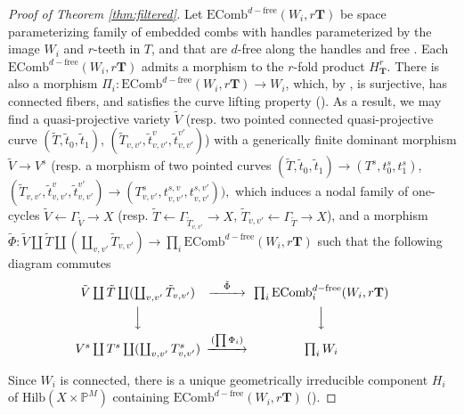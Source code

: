 \documentclass{amsart}
\theoremstyle{definition}
\theoremstyle{remark}
\newcommand{\mbb}{\mathbb}
\newcommand{\PP}{\mbb{P}}
\newcommand{\ecomb}{\text{EComb}}
\newcommand{\free}{\text{free}}
\begin{document}
\begin{proof}[Proof of Theorem \ref{thm:filtered}]
     Let $\ecomb^{d-\free}(W_i, r \mathbf{T})$ be space parameterizing family of embedded combs with handles parameterized by the image $W_i$ and $r$-teeth in $T$, and that are $d$-free along the handles and free \cite[Definition 45, (41.2)]{Kollar_Tian}. 
    Each $\ecomb^{d-\free}(W_i, r \mathbf{T})$ admits a morphism to the $r$-fold product $H_\mathbf{T}^r$.
     There is also a morphism $\Pi_i: \ecomb^{d-\free}(W_i, r \mathbf{T}) \to W_i$, which, by \cite[Theorem 48]{Kollar_Tian}, is surjective, has connected fibers, and satisfies the curve lifting property (\cite[Definition 47]{Kollar_Tian}).
     As a result, we may find a quasi-projective variety $\tilde{V}$ (resp. two pointed connected quasi-projective curve $(\tilde{T}, \tilde{t}_0, \tilde{t}_1)$, $(\tilde{T}_{v, v'}, \tilde{t}_{v, v'}^v, \tilde{t}_{v, v'}^{v'})$)  with a generically finite dominant morphism $\tilde{V} \to V^s$ (resp. a morphism of two pointed curves $(\tilde{T}, \tilde{t}_0, \tilde{t}_1) \to ({T}^s, {t}^s_0, {t}^s_1)$, $(\tilde{T}_{v, v'}, \tilde{t}_{v, v'}^v, \tilde{t}_{v, v'}^{v'})\to ({T}^s_{v, v'}, {t}_{v, v'}^{s, v}, {t}_{v, v'}^{s, v'}) ),$ which induces a nodal family of one-cycles $\tilde{
V} \leftarrow \Gamma_{\tilde{V}} \to X$ (resp. $\tilde{T} \leftarrow \Gamma_{\tilde{T}_{v, v'}} \to X$, $\tilde{T}_{v, v'}\leftarrow \Gamma_{\tilde{T}}\to X$), and a morphism 
     $\tilde{\Phi}: \tilde{V} \coprod \tilde{T} \coprod (\coprod_{v, v'} \tilde{T}_{v,v'}) \to \prod_i \ecomb^{d-\free}(W_i, r \mathbf{T})$
     such that the following diagram commutes
     \[
     \begin{CD}
         \tilde{V} \coprod \tilde{T} \coprod (\coprod_{v, v'} \tilde{T}_{v,v'}) @>\tilde{\Phi}>> \prod_i \ecomb^{d-\free}_i(W_i, r \mathbf{T})\\
         @VVV @VVV\\
         V^s \coprod T^s \coprod (\coprod_{v, v'} T^s_{v,v'}) @>(\prod \Phi_i) >> \prod_i W_i 
     \end{CD}
     \]
     
    Since $W_i$ is connected, there is a unique geometrically irreducible component $H_i$ of $\text{Hilb}(X \times \PP^M)$ containing $\ecomb^{d-\free}(W_i, r \mathbf{T})$ (\cite[Corollary 49]{Kollar_Tian}).
    

\end{proof}
\end{document}
